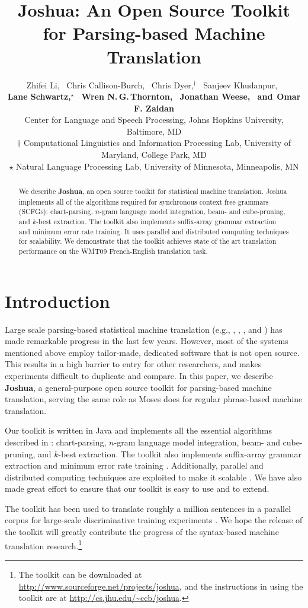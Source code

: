 \documentclass[11pt]{article}
\title{Joshua: An Open Source Toolkit for Parsing-based Machine Translation}
\author{
Zhifei Li,\,\,\,
Chris Callison-Burch,\,\,\, %
Chris Dyer,$^\dagger$\,\,\,
Sanjeev Khudanpur,\,\,\, \\
{\bf Lane Schwartz,$^\star$\,\,\,
Wren N.\,G.\,Thornton,\,\,\,
Jonathan Weese,\,\,\,
{\textnormal{ and}}\,\,\,Omar F. Zaidan}\\
Center for Language and Speech Processing, Johns Hopkins University, Baltimore, MD\\
$\dagger$ Computational Linguistics and Information Processing Lab, University of Maryland, College Park, MD\\
$\star$ Natural Language Processing Lab, University of Minnesota, Minneapolis, MN }
\date{}
\begin{document}
\maketitle


\begin{abstract}
We describe \textbf{Joshua}, an open source toolkit for statistical machine translation.  Joshua implements all of the algorithms required for synchronous context free grammars (SCFGs): chart-parsing, $n$-gram language model integration, beam- and cube-pruning, and $k$-best extraction. The toolkit also implements suffix-array grammar extraction and minimum error rate training. It uses parallel and distributed computing techniques for scalability. We demonstrate that the toolkit achieves state of the art translation performance on the WMT09 French-English translation task.

\end{abstract}


\section{Introduction}
Large scale parsing-based statistical machine translation (e.g., , , , and ) has made remarkable progress in the last few years.
However, most of the systems mentioned above employ tailor-made, dedicated software that is not open source.  This results in a high barrier to entry for other researchers, and makes experiments difficult to duplicate and compare.
In this paper, we describe \textbf{Joshua}, a general-purpose open source toolkit for parsing-based machine translation, serving the same role as Moses \cite{Moses} does for regular phrase-based machine translation.

Our toolkit is written in Java and implements all the essential algorithms described in : chart-parsing, $n$-gram language model integration, beam- and cube-pruning, and $k$-best extraction.  The toolkit also implements suffix-array grammar extraction \cite{Lopez2007} and minimum error rate training \cite{Och2003c}. Additionally, parallel and distributed computing techniques are exploited to make it scalable \cite{Li2008b}. We have also made great effort to ensure that our toolkit is easy to use and to extend.

The toolkit has been used to translate roughly a million sentences in a parallel corpus for large-scale discriminative training experiments \cite{Li2008}.
We hope the release of the toolkit will greatly contribute the progress of the syntax-based machine translation research.\footnote{The toolkit can be downloaded at \url{http://www.sourceforge.net/projects/joshua}, and the instructions in using the toolkit are at \url{http://cs.jhu.edu/~ccb/joshua}.}
\end{document}
